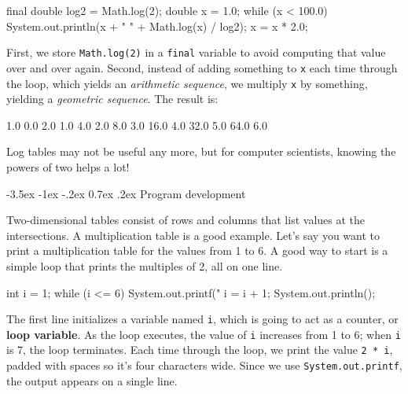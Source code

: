 \documentclass[12pt]{book}
\makeatletter
\theoremstyle{exercise}
\newcommand{\java}[1]{\verb"#1"}
\renewcommand{\section}{\@startsection{section}{1}{\z@}%
    {-3.5ex \@plus -1ex \@minus -.2ex}%
    {0.7ex \@plus.2ex}%
    {\normalfont\Large\bfseries}}
\newcommand{\java}[1]{\lstinline{#1}} %
\makeatother
\begin{document}
\begin{code}
    final double log2 = Math.log(2);
    double x = 1.0;
    while (x < 100.0) {
        System.out.println(x + "   " + Math.log(x) / log2);
        x = x * 2.0;
    }
\end{code}

First, we store \java{Math.log(2)} in a \java{final} variable to avoid computing that value over and over again.
Second, instead of adding something to \java{x} each time through the loop, which yields an {\em arithmetic sequence}, we multiply \java{x} by something, yielding a {\em geometric sequence}.
The result is:

\begin{stdout}
1.0   0.0
2.0   1.0
4.0   2.0
8.0   3.0
16.0   4.0
32.0   5.0
64.0   6.0
\end{stdout}

Log tables may not be useful any more, but for computer scientists, knowing the powers of two helps a lot!


\section{Program development}
\label{encapsulation}


Two-dimensional tables consist of rows and columns that list values at the intersections.
A multiplication table is a good example.
Let's say you want to print a multiplication table for the values from 1 to 6.
A good way to start is a simple loop that prints the multiples of 2, all on one line.

\begin{code}
    int i = 1;
    while (i <= 6) {
        System.out.printf("%
        i = i + 1;
    }
    System.out.println();
\end{code}


The first line initializes a variable named \java{i}, which is going to act as a counter, or {\bf loop variable}.
As the loop executes, the value of \java{i} increases from 1 to 6; when \java{i} is 7, the loop terminates.
Each time through the loop, we print the value \java{2 * i}, padded with spaces so it's four characters wide.
Since we use \java{System.out.printf}, the output appears on a single line.
\end{document}
